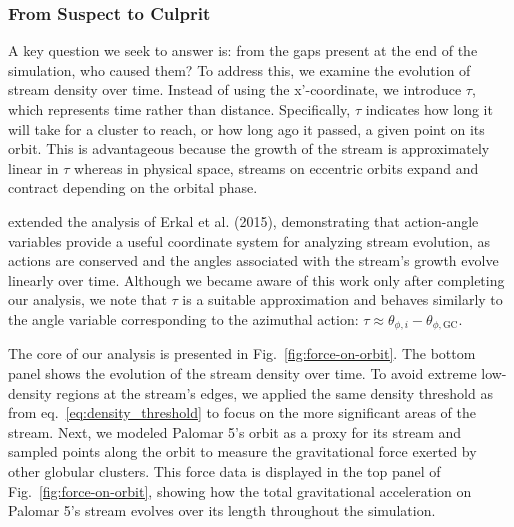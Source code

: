 \documentclass[draft]{aa}
\begin{document}
    
    \subsubsection*{From Suspect to Culprit} \label{SuspectToCulprit}

      A key question we seek to answer is: from the gaps present at the end of the simulation, who caused them? To address this, we examine the evolution of stream density over time. Instead of using the x'-coordinate, we introduce $\tau$, which represents time rather than distance. Specifically, $\tau$ indicates how long it will take for a cluster to reach, or how long ago it passed, a given point on its orbit. This is advantageous because the growth of the stream is approximately linear in $\tau$ whereas in physical space, streams on eccentric orbits expand and contract depending on the orbital phase.


      \citet{sanders2016dynamics} extended the analysis of Erkal et al. (2015), demonstrating that action-angle variables provide a useful coordinate system for analyzing stream evolution, as actions are conserved and the angles associated with the stream's growth evolve linearly over time. Although we became aware of this work only after completing our analysis, we note that $\tau$ is a suitable approximation and behaves similarly to the angle variable corresponding to the azimuthal action: $\tau \approx \theta_{\phi,i} - \theta_{\phi,\text{GC}}$.

      The core of our analysis is presented in Fig.~\ref{fig:force-on-orbit}. The bottom panel shows the evolution of the stream density over time. To avoid extreme low-density regions at the stream's edges, we applied the same density threshold as from eq.~\ref{eq:density_threshold} to focus on the more significant areas of the stream. Next, we modeled Palomar 5's orbit as a proxy for its stream and sampled points along the orbit to measure the gravitational force exerted by other globular clusters. This force data is displayed in the top panel of Fig.~\ref{fig:force-on-orbit}, showing how the total gravitational acceleration on Palomar 5's stream evolves over its length throughout the simulation.
\end{document}
